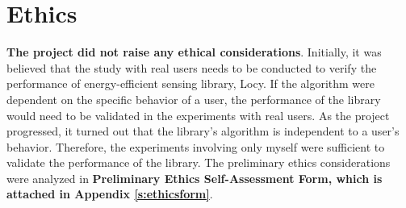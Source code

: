 \section{Ethics}
\label{s:ethics}
\hspace{10pt} \textbf{The project did not raise any ethical considerations}. Initially, it was believed that the study with real users needs to be conducted to verify the performance of energy-efficient sensing library, Locy. If the algorithm were dependent on the specific behavior of a user, the performance of the library would need to be validated in the experiments with real users. As the project progressed, it turned out that the library's algorithm is independent to a user's behavior. Therefore, the experiments involving only myself were sufficient to validate the performance of the library. The preliminary ethics considerations were analyzed in \textbf{Preliminary Ethics Self-Assessment Form, which is attached in Appendix \ref{s:ethicsform}}.